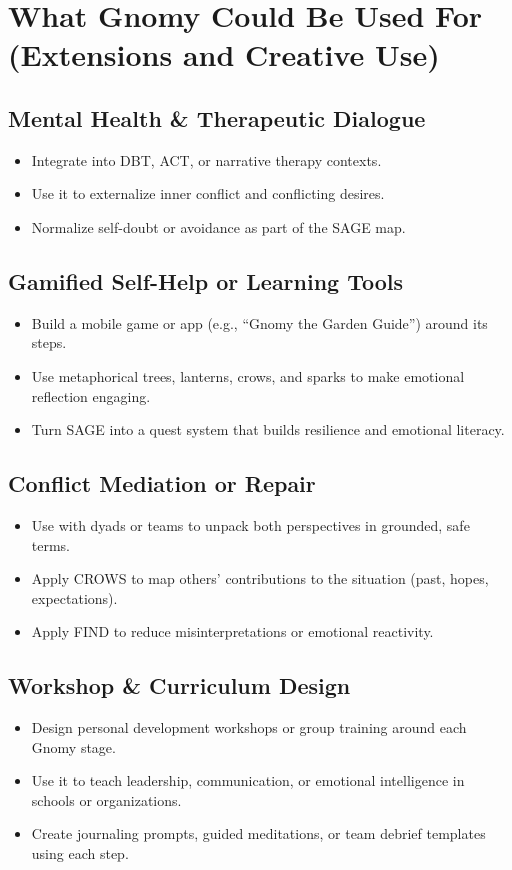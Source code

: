\documentclass{article}
\begin{document}
\section{What Gnomy Could Be Used For (Extensions and Creative Use)}

\subsection{Mental Health \& Therapeutic Dialogue}
\begin{itemize}[noitemsep,topsep=0pt]
    \item Integrate into DBT, ACT, or narrative therapy contexts.
    \item Use it to externalize inner conflict and conflicting desires.
    \item Normalize self-doubt or avoidance as part of the SAGE map.
\end{itemize}

\subsection{Gamified Self-Help or Learning Tools}
\begin{itemize}[noitemsep,topsep=0pt]
    \item Build a mobile game or app (e.g., ``Gnomy the Garden Guide'') around its steps.
    \item Use metaphorical trees, lanterns, crows, and sparks to make emotional reflection engaging.
    \item Turn SAGE into a quest system that builds resilience and emotional literacy.
\end{itemize}

\subsection{Conflict Mediation or Repair}
\begin{itemize}[noitemsep,topsep=0pt]
    \item Use with dyads or teams to unpack both perspectives in grounded, safe terms.
    \item Apply CROWS to map others' contributions to the situation (past, hopes, expectations).
    \item Apply FIND to reduce misinterpretations or emotional reactivity.
\end{itemize}

\subsection{Workshop \& Curriculum Design}
\begin{itemize}[noitemsep,topsep=0pt]
    \item Design personal development workshops or group training around each Gnomy stage.
    \item Use it to teach leadership, communication, or emotional intelligence in schools or organizations.
    \item Create journaling prompts, guided meditations, or team debrief templates using each step.
\end{itemize}
\end{document}
